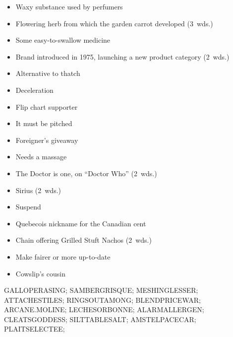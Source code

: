 {  \item
    \begin{itemize}
      \item
        Waxy substance used by perfumers
      \item
        Flowering herb from which the garden carrot developed (3~wds.)
      \item
        Some easy-to-swallow medicine
      \item
        Brand introduced in 1975, launching a new product category (2~wds.)
    \end{itemize}
  \item
    \begin{itemize}
      \item
        Alternative to thatch
      \item
        Deceleration
      \item
        Flip chart supporter
      \item
        It must be pitched
      \item
        Foreigner's giveaway
    \end{itemize}
  \item
    \begin{itemize}
      \item
        Needs a massage
      \item
        The Doctor is one, on ``Doctor Who'' (2~wds.)
      \item
        Sirius (2~wds.)
      \item
        Suspend
    \end{itemize}
  \item
    \begin{itemize}
      \item
        Quebecois nickname for the Canadian cent
      \item
        Chain offering Grilled Stuft Nachos (2~wds.)
      \item
        Make fairer or more up-to-date
    \end{itemize}
  \item
    \begin{itemize}
      \item
        Cowslip's cousin
    \end{itemize}
}{%
  \puzzlerow GALLOPERASING;
  \puzzlerow SAMBERGRISQUE;
  \puzzlerow MESHINGLESSER;
  \puzzlerow ATTACHESTILES;
  \puzzlerow RINGSOUTAMONG;
  \puzzlerow BLENDPRICEWAR;
  \puzzlerow ARCANE.MOLINE;
  \puzzlerow LECHESORBONNE;
  \puzzlerow ALARMALLERGEN;
  \puzzlerow CLEATSGODDESS;
  \puzzlerow SILTTABLESALT;
  \puzzlerow AMSTELPACECAR;
  \puzzlerow PLAITSELECTEE;
}
